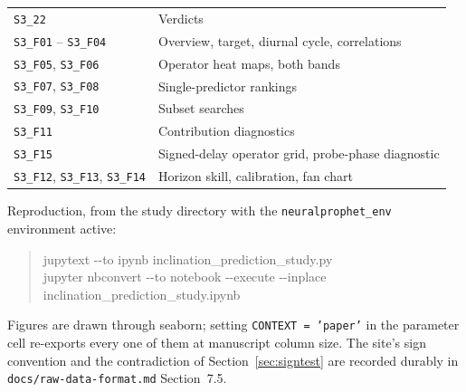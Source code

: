\documentclass[11pt,a4paper]{article}
\begin{document}
\begin{center}
\begin{tabularx}{\textwidth}{L{4.6cm}Y}
\texttt{S3\_22} & Verdicts \\
\addlinespace
\texttt{S3\_F01} -- \texttt{S3\_F04} & Overview, target, diurnal cycle,
correlations \\
\texttt{S3\_F05}, \texttt{S3\_F06} & Operator heat maps, both bands \\
\texttt{S3\_F07}, \texttt{S3\_F08} & Single-predictor rankings \\
\texttt{S3\_F09}, \texttt{S3\_F10} & Subset searches \\
\texttt{S3\_F11} & Contribution diagnostics \\
\texttt{S3\_F15} & Signed-delay operator grid, probe-phase diagnostic \\
\texttt{S3\_F12}, \texttt{S3\_F13}, \texttt{S3\_F14} & Horizon skill,
calibration, fan chart \\
\bottomrule
\end{tabularx}
\end{center}

Reproduction, from the study directory with the \texttt{neuralprophet\_env}
environment active:

\begin{quote}
\ttfamily\small
jupytext -{}-to ipynb inclination\_prediction\_study.py \\
jupyter nbconvert -{}-to notebook -{}-execute -{}-inplace \\
\phantom{jupyter nbconvert }inclination\_prediction\_study.ipynb
\end{quote}

Figures are drawn through seaborn; setting \texttt{CONTEXT = 'paper'} in the
parameter cell re-exports every one of them at manuscript column size. The
site's sign convention and the contradiction of Section~\ref{sec:signtest} are
recorded durably in \texttt{docs/raw-data-format.md} Section~7.5.
\end{document}

